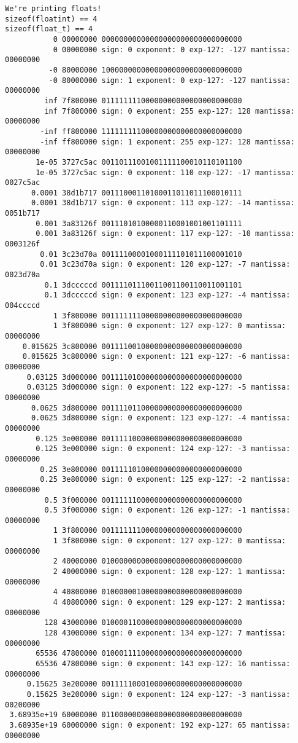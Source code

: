 \documentclass[11pt]{article}
\begin{document}
\begin{verbatim}
We're printing floats!
sizeof(floatint) == 4
sizeof(float_t) == 4
           0 00000000 00000000000000000000000000000000
           0 00000000 sign: 0 exponent: 0 exp-127: -127 mantissa: 00000000
          -0 80000000 10000000000000000000000000000000
          -0 80000000 sign: 1 exponent: 0 exp-127: -127 mantissa: 00000000
         inf 7f800000 01111111100000000000000000000000
         inf 7f800000 sign: 0 exponent: 255 exp-127: 128 mantissa: 00000000
        -inf ff800000 11111111100000000000000000000000
        -inf ff800000 sign: 1 exponent: 255 exp-127: 128 mantissa: 00000000
       1e-05 3727c5ac 00110111001001111100010110101100
       1e-05 3727c5ac sign: 0 exponent: 110 exp-127: -17 mantissa: 0027c5ac
      0.0001 38d1b717 00111000110100011011011100010111
      0.0001 38d1b717 sign: 0 exponent: 113 exp-127: -14 mantissa: 0051b717
       0.001 3a83126f 00111010100000110001001001101111
       0.001 3a83126f sign: 0 exponent: 117 exp-127: -10 mantissa: 0003126f
        0.01 3c23d70a 00111100001000111101011100001010
        0.01 3c23d70a sign: 0 exponent: 120 exp-127: -7 mantissa: 0023d70a
         0.1 3dcccccd 00111101110011001100110011001101
         0.1 3dcccccd sign: 0 exponent: 123 exp-127: -4 mantissa: 004ccccd
           1 3f800000 00111111100000000000000000000000
           1 3f800000 sign: 0 exponent: 127 exp-127: 0 mantissa: 00000000
    0.015625 3c800000 00111100100000000000000000000000
    0.015625 3c800000 sign: 0 exponent: 121 exp-127: -6 mantissa: 00000000
     0.03125 3d000000 00111101000000000000000000000000
     0.03125 3d000000 sign: 0 exponent: 122 exp-127: -5 mantissa: 00000000
      0.0625 3d800000 00111101100000000000000000000000
      0.0625 3d800000 sign: 0 exponent: 123 exp-127: -4 mantissa: 00000000
       0.125 3e000000 00111110000000000000000000000000
       0.125 3e000000 sign: 0 exponent: 124 exp-127: -3 mantissa: 00000000
        0.25 3e800000 00111110100000000000000000000000
        0.25 3e800000 sign: 0 exponent: 125 exp-127: -2 mantissa: 00000000
         0.5 3f000000 00111111000000000000000000000000
         0.5 3f000000 sign: 0 exponent: 126 exp-127: -1 mantissa: 00000000
           1 3f800000 00111111100000000000000000000000
           1 3f800000 sign: 0 exponent: 127 exp-127: 0 mantissa: 00000000
           2 40000000 01000000000000000000000000000000
           2 40000000 sign: 0 exponent: 128 exp-127: 1 mantissa: 00000000
           4 40800000 01000000100000000000000000000000
           4 40800000 sign: 0 exponent: 129 exp-127: 2 mantissa: 00000000
         128 43000000 01000011000000000000000000000000
         128 43000000 sign: 0 exponent: 134 exp-127: 7 mantissa: 00000000
       65536 47800000 01000111100000000000000000000000
       65536 47800000 sign: 0 exponent: 143 exp-127: 16 mantissa: 00000000
     0.15625 3e200000 00111110001000000000000000000000
     0.15625 3e200000 sign: 0 exponent: 124 exp-127: -3 mantissa: 00200000
 3.68935e+19 60000000 01100000000000000000000000000000
 3.68935e+19 60000000 sign: 0 exponent: 192 exp-127: 65 mantissa: 00000000
\end{verbatim}
\end{document}
